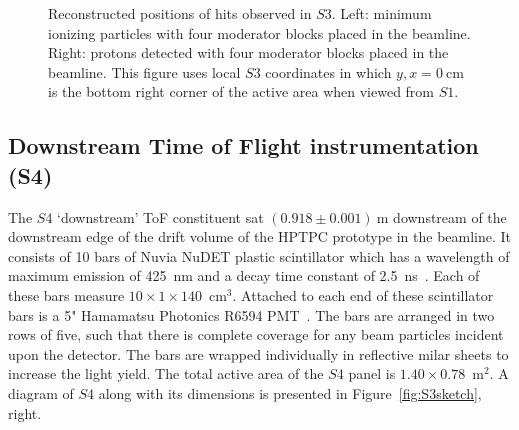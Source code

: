 \begin{figure}[t]
  \begin{minipage}[t]{0.49\textwidth}
    \centering
    \begin{adjustbox}{max totalsize={\textwidth}{.5\textheight},center}
      
    \end{adjustbox}
  \end{minipage} 	
  \hfill
  \begin{minipage}[t]{0.49\textwidth}
    \centering
    \begin{adjustbox}{max totalsize={\textwidth}{.5\textheight},center}
      
    \end{adjustbox}
  \end{minipage}  
   \caption{ \label{fig:s3XY_pion}Reconstructed positions of hits observed in $\mathit{S3}$. Left: minimum ionizing particles with four moderator blocks placed in the beamline. Right: protons detected with four moderator blocks placed in the beamline. This figure uses local $\mathit{S3}$ coordinates in which $y,x=0~\text{cm}$ is the bottom right corner of the active area when viewed from $\mathit{S1}$.}
\end{figure}


\subsection{Downstream Time of Flight instrumentation (S4)}
\label{subsec:s4Exp}
The $\mathit{S4}$ `downstream' ToF constituent sat $(0.918 \pm 0.001)~\text{m}$ downstream of the downstream edge of the drift volume of the HPTPC prototype in the beamline.
It consists of 10 bars of Nuvia NuDET plastic scintillator which has a wavelength of maximum emission of 425~nm and a decay time constant of 2.5~ns~\cite{Nuvia}.
Each of these bars measure $10 \times 1 \times 140$~cm$^3$. 
Attached to each end of these scintillator bars is a 5" Hamamatsu Photonics R6594 PMT~\cite{Hamamatsu}.
The bars are arranged in two rows of five, such that there is complete coverage for any beam particles incident upon the detector.
The bars are wrapped individually in reflective milar sheets to increase the light yield.
The total active area of the $\mathit{S4}$ panel is $1.40 \times 0.78$~m$^2$.
A diagram of $\mathit{S4}$ along with its dimensions is presented in Figure~\ref{fig:S3sketch}, right.

